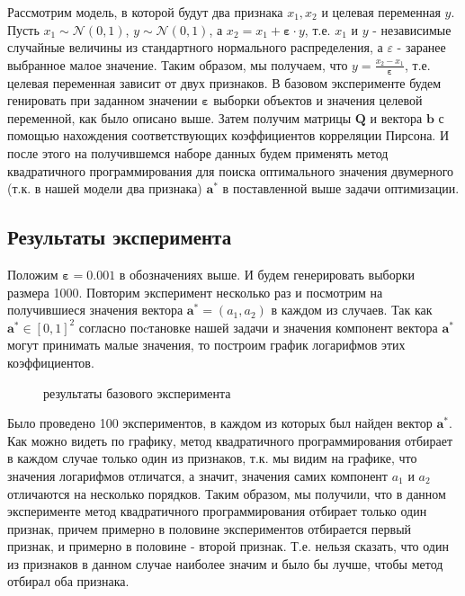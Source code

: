 \documentclass[12pt, twoside]{article}
\newcommand{\ba}{\mathbf{a}}
\newcommand{\bb}{\mathbf{b}}
\newcommand{\bQ}{\mathbf{Q}}
\newcommand{\beps}{\boldsymbol{\varepsilon}}
\newcommand{\cN}{\mathcal{N}}
\begin{document}
Рассмотрим модель, в которой будут два признака $x_1, x_2$ и целевая переменная $y$. Пусть $x_1 \sim \cN(0, 1)$, $y \sim \cN(0, 1)$, а $x_2 = x_1 + \beps \cdot y$, т.е. $x_1$ и $y$ - независимые случайные величины из стандартного нормального распределения, а $\varepsilon$ - заранее выбранное малое значение. Таким образом, мы получаем, что $y = \frac{x_2 - x_1}{\beps}$, т.е. целевая переменная зависит от двух признаков. В базовом эксперименте будем генировать при заданном значении $\beps$ выборки объектов и значения целевой переменной, как было описано выше.  Затем получим матрицы $\bQ$ и вектора $\bb$ с помощью нахождения соответствующих коэффициентов корреляции Пирсона. И после этого на получившемся наборе данных будем применять метод квадратичного программирования для поиска оптимального значения двумерного (т.к. в нашей модели два признака) $\ba^*$ в поставленной выше задачи оптимизации.

\subsection{Результаты эксперимента}

Положим $\beps = 0.001$ в обозначениях выше. И будем генерировать выборки размера 1000. Повторим эксперимент несколько раз и посмотрим на получившиеся значения вектора $\ba^* = (a_1, a_2)$ в каждом из случаев. Так как $\ba^* \in [0, 1]^2$ согласно поcтановке нашей задачи и значения компонент вектора $\ba^*$ могут принимать малые значения, то построим график логарифмов этих коэффициентов. 

\begin{figure}[htb]
\caption{результаты базового эксперимента}
\label{fig:image, d11_lower_pic}
\end{figure}


Было проведено 100 экспериментов, в каждом из которых был найден вектор $\ba^*$. Как можно видеть по графику, метод квадратичного программирования отбирает в каждом случае только один из признаков, т.к. мы видим на графике, что значения логарифмов отличатся, а значит, значения самих компонент $a_1$ и $a_2$ отличаются на несколько порядков. Таким образом, мы получили, что в данном эксперименте метод квадратичного программирования отбирает только один признак, причем примерно в половине экспериментов отбирается первый признак, и примерно в половине - второй признак. Т.е. нельзя сказать, что один из признаков в данном случае наиболее значим и было бы лучше, чтобы метод отбирал оба признака.
\end{document}
